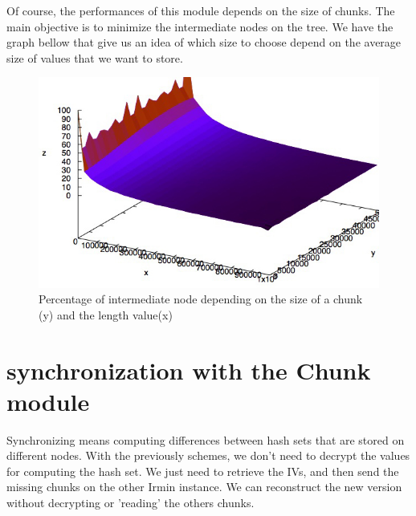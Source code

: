 \documentclass[10pt,a4paper]{report}
\begin{document}
Of course, the performances of this module depends on the size of chunks. The main objective is to minimize the intermediate nodes on the tree. We have the graph bellow that give us an idea of which size to choose depend on the average size of values that we want to store. 

\begin{figure}[H]
\centerline{\includegraphics[scale=1]{img/chunk-graphic.jpg}}
\caption{Percentage of intermediate node depending on the size of a chunk (y) and the length value(x)}
\end{figure}

\newpage


\section{synchronization with the Chunk module}

Synchronizing means computing differences between hash sets that are stored on different nodes. With the previously schemes, we don't need to decrypt the values for computing the hash set. 
We just need to retrieve the IVs, and then send the missing chunks on the other Irmin instance. We can reconstruct the new version without decrypting or 'reading' the others chunks. \newline
\end{document}
